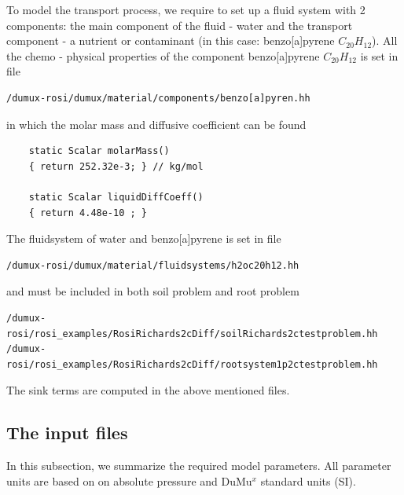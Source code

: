 To model the transport process, we require to set up a fluid system with 2 components: the main component of the fluid - water and the transport component - a nutrient or contaminant (in this case: benzo{[}a{]}pyrene $C_{20}H_{12}$). All the chemo - physical properties of the component
benzo{[}a{]}pyrene $C_{20}H_{12}$ is set in file

\begin{lstlisting}
/dumux-rosi/dumux/material/components/benzo[a]pyren.hh
\end{lstlisting}

in which the molar mass and diffusive coefficient can be found

\begin{lstlisting}
    static Scalar molarMass()
    { return 252.32e-3; } // kg/mol

    static Scalar liquidDiffCoeff()
    { return 4.48e-10 ; }
\end{lstlisting}

The fluidsystem of water and benzo{[}a{]}pyrene is set in file

\begin{lstlisting}
/dumux-rosi/dumux/material/fluidsystems/h2oc20h12.hh
\end{lstlisting}

and must be included in both soil problem and root problem

\begin{lstlisting}
/dumux-rosi/rosi_examples/RosiRichards2cDiff/soilRichards2ctestproblem.hh
/dumux-rosi/rosi_examples/RosiRichards2cDiff/rootsystem1p2ctestproblem.hh
\end{lstlisting}


The sink terms are computed in the above mentioned files.





\subsection*{The input files}

In this subsection, we summarize the required model parameters. All parameter units are based on on absolute pressure and DuMu$^{x}$ standard units (SI).

